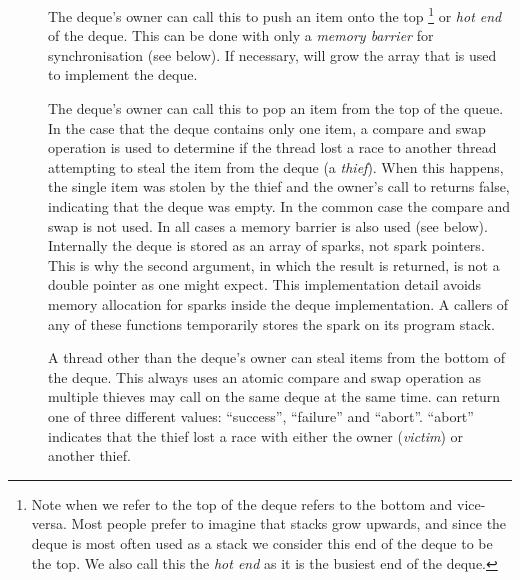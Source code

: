 \begin{description}

    \item[]
    The deque's owner can call this to push an item onto the
    top%
\footnote{
        Note when we refer to the top of the deque
        \citet{Chase_2005_wsdeque} refers to the bottom and vice-versa.
        Most people prefer to imagine that stacks grow upwards,
        and since the deque is most often used as a stack we consider this
        end of the deque to be the top.
        We also call this the \emph{hot end} as it is the busiest end of the
        deque.}
    or \emph{hot end} of the deque.
    This can be done with only a \emph{memory barrier} for synchronisation
    (see below).
    If necessary,
    \push will grow the array that is used to implement the
    deque.

    \item[]
    The deque's owner can call this to pop an item from the top of the
    queue.
    In the case that the deque contains only one item,
    a compare and swap
    operation is used to determine if the thread lost a race to another
    thread attempting to steal the item from the deque (a \emph{thief}).
    When this happens, the single item was stolen by the thief and the
    owner's call to \pop returns false,
    indicating that the deque was empty.
    In the common case the compare and swap is not used.
    In all cases a memory barrier is also used (see below).
    Internally the deque is stored as an array of sparks, not spark
    pointers.
    This is why the second argument, in which the result is returned,
    is not a double pointer as one might expect.
    This implementation detail avoids memory allocation for sparks inside
    the deque implementation.
    A callers of any of these functions temporarily stores the spark on
    its program stack.

    \item[]
    A thread other than the deque's owner can steal
    items from the bottom of the deque.
    This always uses an atomic compare and swap operation as multiple
    thieves may call \steal on the same deque at the same time.
    \steal can return one of three different values:
    ``success'', ``failure'' and ``abort''.
    ``abort'' indicates that the thief lost a race with either the owner
    (\emph{victim}) or another thief.

\end{description}

